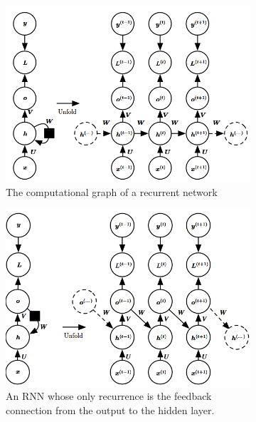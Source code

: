 \begin{figure}[!ht]
    \centering
    \begin{subfigure}[b]{0.3\textwidth}
        \centering
        \includegraphics[width=\linewidth]{img/RNN/RNN.png}
        \caption{The computational graph of a recurrent network}
        \label{fig:rnn}
    \end{subfigure}
    \hfill
    \begin{subfigure}[b]{0.3\textwidth}
        \centering
        \includegraphics[width=\linewidth]{img/RNN/RNN1.png}
        \caption{An RNN whose only recurrence is the feedback connection from the
            output to the hidden layer.}
        \label{fig:rnn1}
    \end{subfigure}
    \hfill
    \begin{subfigure}[b]{0.3\textwidth}

\end{subfigure}
\end{figure}
